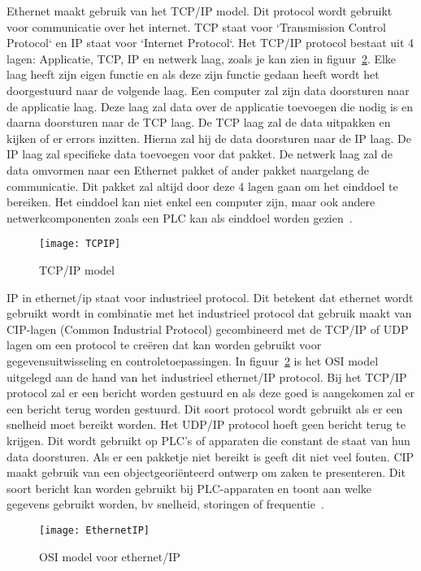 Ethernet maakt gebruik van het TCP/IP model. Dit protocol wordt gebruikt voor communicatie over het internet. TCP staat voor `Transmission Control Protocol` en IP staat voor `Internet Protocol`. Het TCP/IP protocol bestaat uit 4 lagen: Applicatie, TCP, IP en netwerk laag, zoals je kan zien in figuur~\ref{fig:2.10}. Elke laag heeft zijn eigen functie en als deze zijn functie gedaan heeft wordt het doorgestuurd naar de volgende laag. Een computer zal zijn data doorsturen naar de applicatie laag. Deze laag zal data over de applicatie toevoegen die nodig is en daarna doorsturen naar de TCP laag. De TCP laag zal de data uitpakken en kijken of er errors inzitten. Hierna zal hij de data doorsturen naar de IP laag. De IP laag zal specifieke data toevoegen voor dat pakket. De netwerk laag zal de data omvormen naar een Ethernet pakket of ander pakket naargelang de communicatie. Dit pakket zal altijd door deze 4 lagen gaan om het einddoel te bereiken. Het einddoel kan niet enkel een computer zijn, maar ook andere netwerkcomponenten zoals een PLC kan als einddoel worden gezien~\autocite{Realpars2019a}.
\begin{figure}
    \texttt{[image: TCPIP]}
    \caption{TCP/IP model\autocite{GeeksforGeeks2020a} \label{fig:2.9}} 
    
\end{figure}

IP in ethernet/ip staat voor industrieel protocol. Dit betekent dat ethernet wordt gebruikt wordt in combinatie met het industrieel protocol dat gebruik maakt van CIP-lagen (Common Industrial Protocol) gecombineerd met de TCP/IP of UDP lagen om een protocol te creëren dat kan worden gebruikt voor gegevensuitwisseling en controletoepassingen. In figuur~\ref{fig:2.10} is het OSI model uitgelegd aan de hand van het industrieel ethernet/IP protocol. Bij het TCP/IP protocol zal er een bericht worden gestuurd en als deze goed is aangekomen zal er een bericht terug worden gestuurd. Dit soort protocol wordt gebruikt als er een snelheid moet bereikt worden. Het UDP/IP protocol hoeft geen bericht terug te krijgen. Dit wordt gebruikt op PLC's of apparaten die constant de staat van hun data doorsturen. Als er een pakketje niet bereikt is geeft dit niet veel fouten. CIP maakt gebruik van een objectgeoriënteerd ontwerp om zaken te presenteren. Dit soort bericht kan worden gebruikt bij PLC-apparaten en toont aan welke gegevens gebruikt worden, bv snelheid, storingen of frequentie~\autocite{Realpars2019a}.
\begin{figure} 
    \texttt{[image: EthernetIP]}
    \caption{OSI model voor ethernet/IP\autocite{Realpars2019a} \label{fig:2.10}} 
\end{figure}

